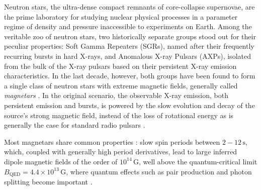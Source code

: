 \documentclass[12pt]{emulateapj}
\begin{document}
Neutron stars, the ultra-dense compact remnants of core-collapse supernovae, are the prime laboratory for studying nuclear 
physical processes in a parameter regime of density and pressure inaccessible to experiments on Earth. 
Among the veritable zoo of neutron stars, two historically separate groups stood out for their peculiar properties: Soft Gamma Repeaters (SGRs), named after their frequently recurring bursts in hard X-rays, and Anomalous X-ray Pulsars (AXPs), isolated from the bulk of the X-ray pulsars based on their persistent X-ray
emission characteristics. In the last decade, however, both groups have been found to form a single class of neutron stars with extreme magnetic fields, generally called {\it magnetars} \citep{duncan1992,thompson1995}. In the original scenario, the observable X-ray emission, both persistent emission and bursts, 
is powered by the slow evolution and decay of the source's strong magnetic field, instead of the loss of rotational energy as is generally the case for standard radio pulsars \citep{thompson1995,thompson2001}. 

Most magnetars share common properties \citep[for general overviews, see ][]{woods2006,mereghetti2011}: slow spin periods between
$2 - 12 \, \mathrm{s}$, which, coupled with generally high period derivatives, lead to large inferred dipole magnetic fields of
the order of $10^{14} \, \mathrm{G}$, well above the quantum-critical limit $B_{\mathrm{QED}} = 4.4 \times 10^{13} \, \mathrm{G}$,
where quantum effects such as pair production and photon splitting become important \citep[although three sources have been 
identified with properties similar to magnetars, but inferred dipole fields below this limit;][]{vanderhorst2010,esposito2010,rea2010,rea2012,scholz2012,rea2014}. 


\end{document}
